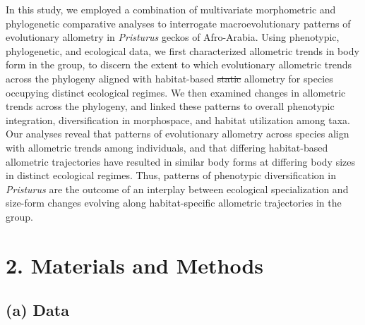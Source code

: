 \documentclass[
  11pt,
]{article}
\providecommand{\DIFaddtex}[1]{{\protect\color{blue}\uwave{#1}}} %
\providecommand{\DIFdeltex}[1]{{\protect\color{red}\sout{#1}}}                      %
\providecommand{\DIFaddbegin}{} %
\providecommand{\DIFaddend}{} %
\providecommand{\DIFdelbegin}{} %
\providecommand{\DIFdelend}{} %
\providecommand{\DIFadd}[1]{\texorpdfstring{\DIFaddtex{#1}}{#1}} %
\providecommand{\DIFdel}[1]{\texorpdfstring{\DIFdeltex{#1}}{}} %
\newcommand{\DIFscaledelfig}{0.5}
\newlength{\DIFdelgraphicswidth} %
\newlength{\DIFdelgraphicsheight} %
\newcommand{\DIFaddincludegraphics}[2][]{{\color{blue}\fbox{\DIFOincludegraphics[#1]{#2}}}} %
\newcommand{\DIFdelincludegraphics}[2][]{%
\sbox{\DIFdelgraphicsbox}{\DIFOincludegraphics[#1]{#2}}%
\settoboxwidth{\DIFdelgraphicswidth}{\DIFdelgraphicsbox} %
\settoboxtotalheight{\DIFdelgraphicsheight}{\DIFdelgraphicsbox} %
\scalebox{\DIFscaledelfig}{%
\parbox[b]{\DIFdelgraphicswidth}{\usebox{\DIFdelgraphicsbox}\\[-\baselineskip] \rule{\DIFdelgraphicswidth}{0em}}\llap{\resizebox{\DIFdelgraphicswidth}{\DIFdelgraphicsheight}{%
\setlength{\unitlength}{\DIFdelgraphicswidth}%
\begin{picture}(1,1)%
\thicklines\linethickness{2pt} %
{\color[rgb]{1,0,0}\put(0,0){\framebox(1,1){}}}%
{\color[rgb]{1,0,0}\put(0,0){\line( 1,1){1}}}%
{\color[rgb]{1,0,0}\put(0,1){\line(1,-1){1}}}%
\end{picture}%
}\hspace*{3pt}}} %
} %
\DeclareRobustCommand{\DIFaddbegin}{\DIFOaddbegin \let\includegraphics\DIFaddincludegraphics} %
\DeclareRobustCommand{\DIFaddend}{\DIFOaddend \let\includegraphics\DIFOincludegraphics} %
\DeclareRobustCommand{\DIFdelbegin}{\DIFOdelbegin \let\includegraphics\DIFdelincludegraphics} %
\DeclareRobustCommand{\DIFdelend}{\DIFOaddend \let\includegraphics\DIFOincludegraphics} %
\begin{document}
In this study, we employed a combination of multivariate morphometric
and phylogenetic comparative analyses to interrogate macroevolutionary
patterns of evolutionary allometry in \emph{Pristurus} geckos of
Afro-Arabia. Using phenotypic, phylogenetic, and ecological data, we
first characterized allometric trends in body form in the group, to
discern the extent to which evolutionary allometric trends across the
phylogeny aligned with habitat-based \DIFdelbegin \DIFdel{static }\DIFdelend \DIFaddbegin \DIFadd{intraspecific }\DIFaddend allometry for species
occupying distinct ecological regimes. We then examined changes in
allometric trends across the phylogeny, and linked these patterns to
overall phenotypic integration, diversification in morphospace, and
habitat utilization among taxa. Our analyses reveal that patterns of
evolutionary allometry across species align with allometric trends among
individuals, and that differing habitat-based allometric trajectories
have resulted in similar body forms at differing body sizes in distinct
ecological regimes. Thus, patterns of phenotypic diversification in
\emph{Pristurus} are the outcome of an interplay between ecological
specialization and size-form changes evolving along habitat-specific
allometric trajectories in the group.

\hypertarget{materials-and-methods}{%
\section{2. Materials and Methods}\label{materials-and-methods}}

\hypertarget{a-data}{%
\subsection{(a) Data}\label{a-data}}
\end{document}
